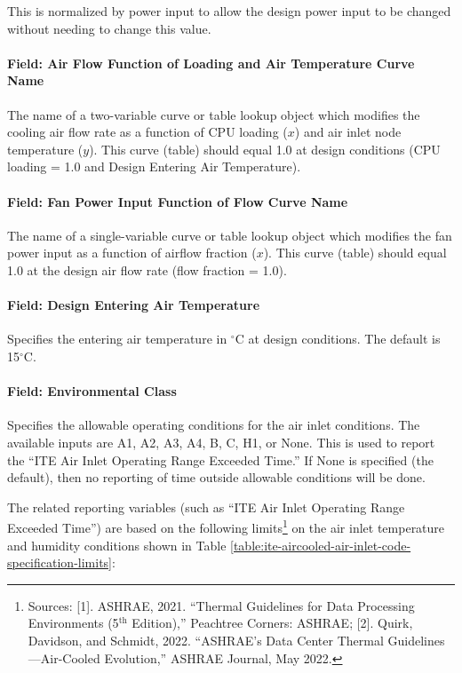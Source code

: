 This is normalized by power input to allow the design power input to be changed without needing to change this value.

\paragraph{Field: Air Flow Function of Loading and Air Temperature Curve Name}\label{field-air-flow-function-of-loading-and-air-temperature-curve-name}

The name of a two-variable curve or table lookup object which modifies the cooling air flow rate as a function of CPU loading ($x$) and air inlet node temperature ($y$). This curve (table) should equal 1.0 at design conditions (CPU loading = 1.0 and Design Entering Air Temperature).

\paragraph{Field: Fan Power Input Function of Flow Curve Name}\label{field-fan-power-input-function-of-flow-curve-name}

The name of a single-variable curve or table lookup object which modifies the fan power input as a function of airflow fraction ($x$). This curve (table) should equal 1.0 at the design air flow rate (flow fraction = 1.0).

\paragraph{Field: Design Entering Air Temperature}\label{field-design-entering-air-temperature}

Specifies the entering air temperature in $^\circ$C at design conditions. The default is 15$^\circ$C.

\paragraph{Field: Environmental Class}\label{field-environmental-class}

Specifies the allowable operating conditions for the air inlet conditions. The available inputs are A1, A2, A3, A4, B, C, H1, or None. This is used to report the ``ITE Air Inlet Operating Range Exceeded Time.'' If None is specified (the default), then no reporting of time outside allowable conditions will be done.

The related reporting variables (such as ``ITE Air Inlet Operating Range Exceeded Time'') are based on the following limits\footnote{Sources: [1]. ASHRAE, 2021. ``Thermal Guidelines for Data Processing Environments (5$^{\textrm{th}}$ Edition),'' Peachtree Corners: ASHRAE; [2]. Quirk, Davidson, and Schmidt, 2022. ``ASHRAE's Data Center Thermal Guidelines---Air-Cooled Evolution,'' ASHRAE Journal, May 2022.} on the air inlet temperature and humidity conditions shown in Table \ref{table:ite-aircooled-air-inlet-code-specification-limits}:


